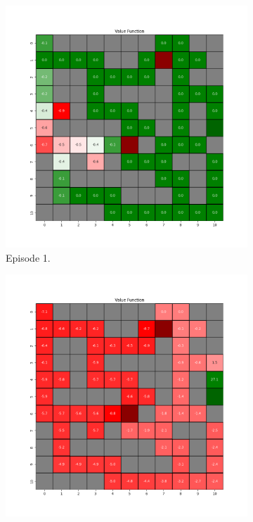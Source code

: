 \documentclass{assignment}
\begin{document}
\begin{figure}[H]
    \begin{subfigure}{0.3\textwidth}
        \includegraphics[width=\textwidth]{figures/value_q/default/value_function_alpha_0.1_gamma_0.95_epsilon_0.2_iteration_1.png}
    \caption{Episode 1.}
    \end{subfigure}\hfill
    \begin{subfigure}{0.3\textwidth}
        \includegraphics[width=\textwidth]{figures/value_q/default/value_function_alpha_0.1_gamma_0.95_epsilon_0.2_iteration_50.png}

\end{subfigure}
\end{figure}
\end{document}
